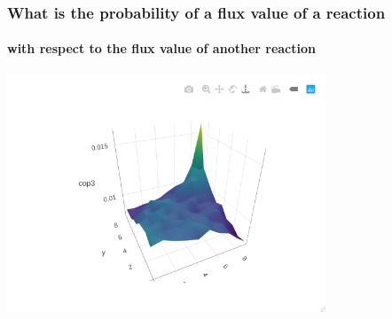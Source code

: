 \documentclass{beamer}
\begin{document}
   \begin{frame}
      \frametitle{What is the probability of a flux value of a reaction}
      \framesubtitle{with respect to the flux value of another reaction}
      \centering
      \includegraphics[width=95mm]{resources/hex_-_g6pper_transp.png}
   \end{frame}
\end{document}
